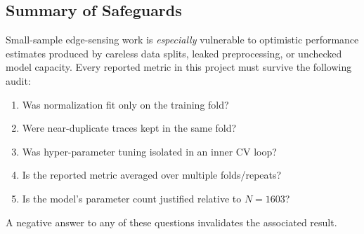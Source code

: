 \subsection{Summary of Safeguards}
\label{sec:overfit:summary}

\begin{tcolorbox}[
  colback=yellow!5!white,
  colframe=yellow!70!black,
  title={\textbf{Key Principle}},
  fonttitle=\bfseries
]
Small-sample edge-sensing work is \emph{especially} vulnerable to
optimistic performance estimates produced by careless data splits,
leaked preprocessing, or unchecked model capacity.  Every reported
metric in this project must survive the following audit:
\begin{enumerate}[nosep]
  \item Was normalization fit only on the training fold?
  \item Were near-duplicate traces kept in the same fold?
  \item Was hyper-parameter tuning isolated in an inner CV loop?
  \item Is the reported metric averaged over multiple folds/repeats?
  \item Is the model's parameter count justified relative to $N=1603$?
\end{enumerate}
A negative answer to any of these questions invalidates the associated
result.
\end{tcolorbox}
